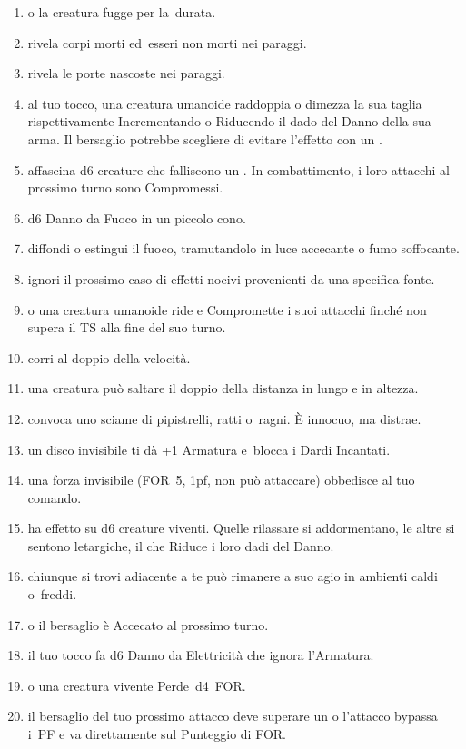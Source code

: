 \documentclass[itdr]{subfiles}
\begin{document}
\begin{enumerate}
\vfill
\break
	
	\item {}  o la creatura fugge per la~durata.
	\item {} rivela corpi morti ed~esseri non morti nei paraggi.
	\item {} rivela le porte nascoste nei paraggi.
	\item {} al tuo tocco, una creatura umanoide raddoppia o dimezza la sua taglia rispettivamente Incrementando o Riducendo il dado del Danno della sua arma. Il bersaglio potrebbe scegliere di evitare l’effetto con un .
	\item {} affascina d6 creature che falliscono un . In combattimento, i loro attacchi al prossimo turno sono Compromessi.
	\item {} d6 Danno da Fuoco in un piccolo cono.
	\item {} diffondi o estingui il fuoco, tramutandolo in luce accecante o fumo soffocante.
	\item {} ignori il prossimo caso di effetti nocivi provenienti da una specifica fonte.
	\item {}  o una creatura umanoide ride e Compromette i suoi attacchi finché non supera il TS alla fine del suo turno.
	\item {} corri al doppio della velocità.
	\item {} una creatura può saltare il doppio della distanza in lungo e in altezza.
	\item {} convoca uno sciame di pipistrelli, ratti o~ragni. È innocuo, ma distrae.
	\item {} un disco invisibile ti dà +1 Armatura e~blocca i Dardi Incantati.
	\item {} una forza invisibile (FOR~5, 1pf, non può attaccare) obbedisce al tuo comando.
	\item {} ha effetto su d6 creature viventi. Quelle rilassare si addormentano, le altre si sentono letargiche, il che Riduce i loro dadi del \mbox{Danno}.
	\item {} chiunque si trovi \mbox{adiacente} a te può rimanere a suo agio in ambienti caldi o~freddi.
	\item {}  o il bersaglio è Accecato al prossimo turno.
	\item {} il tuo tocco fa d6 \mbox{Danno} da Elettricità che ignora l’Armatura.
	\item {}  o una creatura vivente Perde~d4~FOR.
	\item {} il bersaglio del tuo prossimo attacco deve superare un  o l’attacco bypassa i~PF e va direttamente sul Punteggio di FOR.
\end{enumerate}
\end{document}
